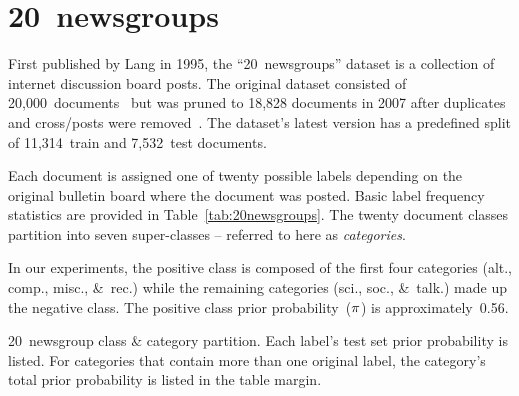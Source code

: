\section{20~newsgroups}\label{sec:20newsgroups}

First published by Lang in 1995, the ``20~newsgroups'' dataset is a collection of internet discussion board posts.  The original dataset consisted of 20,000~documents~\cite{20newsgroups} but was pruned to 18,828 documents in 2007 after duplicates and cross\-/posts were removed~\cite{Rennie:2007}.   The dataset's latest version has a predefined split of 11,314~train and 7,532~test documents.

Each document is assigned one of twenty possible labels depending on the original bulletin board where the document was posted.  Basic label frequency statistics are provided in Table~\ref{tab:20newsgroups}. The twenty document classes partition into seven super-classes -- referred to here as \textit{categories}.

In our experiments, the positive class is composed of the first four categories (alt., comp., misc., \&~rec.) while the remaining categories (sci., soc., \&~talk.) made up the negative class.  The positive class prior probability~($\pi$) is approximately~0.56.

\begin{table}[t]
  \centering
  \caption{20~newsgroup class \& category partition.  Each label's test set prior probability is listed.  For categories that contain more than one original label, the category's total prior probability is listed in the table margin.}\label{tab:20newsgroups}
  
\end{table}

